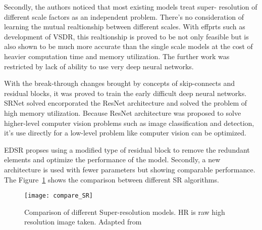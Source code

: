 Secondly, the authors noticed that most existing models treat super- resolution of different scale factors as an independent problem. There's no consideration of learning the mutual realtionship between different scales. With effprts such as development of VSDR, this realtionship is proved to be not only feasible but is also shown to be much more accurate than the single scale models at the cost of heavier computation time and memory utilization. The further work was restricted by lack of ability to use very deep neural networks. \par

With the break-through changes brought by concepts of skip-connects and residual blocks, it was proved to train the early difficult deep neural networks. SRNet solved encorporated the ResNet architecture and solved the problem of high memory utilization. Because ResNet architecture was proposed to solve higher-level computer vision problems such as image classification and detection, it's use directly for a low-level problem like computer vision can be optimized. \par

EDSR propses using a modified type of residual block to remove the redundant elements and optimize the performance of the model. Secondly, a new architecture is used with fewer parameters but showing comparable performance. The Figure~\ref{fig:compare_SR} shows the comparison between different SR algorithms.

\begin{figure}
  \centering
  \texttt{[image: compare\_SR]}
  \caption[Comparison of different Super-resolution models.]{Comparison of different Super-resolution models. HR is raw high resolution image taken. Adapted from \cite{EDSR}}
  \label{fig:compare_SR}
\end{figure}
